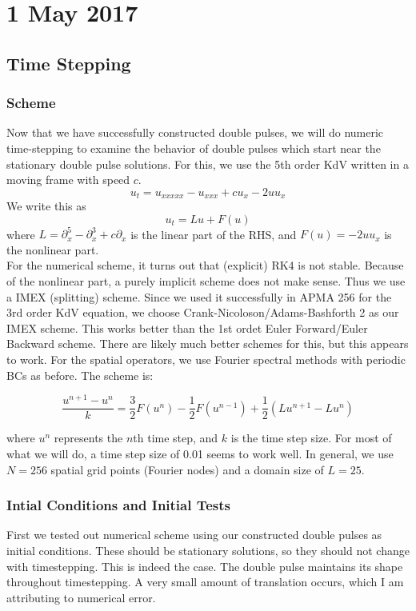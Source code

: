 \documentclass[12pt]{article}
\begin{document}
\section*{1 May 2017}

\subsection*{Time Stepping}

\subsubsection*{Scheme}
Now that we have successfully constructed double pulses, we will do numeric time-stepping to examine the behavior of double pulses which start near the stationary double pulse solutions. For this, we use the 5th order KdV written in a moving frame with speed $c$.
\[
u_t = u_{xxxxx} - u_{xxx} + c u_x - 2 u u_x
\]
We write this as
\[
u_t = Lu + F(u)
\]
where $L = \partial_x^5 - \partial_x^3 + c \partial_x$ is the linear part of the RHS, and $F(u) = -2 u u_x$ is the nonlinear part.\\

For the numerical scheme, it turns out that (explicit) RK4 is not stable. Because of the nonlinear part, a purely implicit scheme does not make sense. Thus we use a IMEX (splitting) scheme. Since we used it successfully in APMA 256 for the 3rd order KdV equation, we choose Crank-Nicoloson/Adams-Bashforth 2 as our IMEX scheme. This works better than the 1st ordet Euler Forward/Euler Backward scheme. There are likely much better schemes for this, but this appears to work. For the spatial operators, we use Fourier spectral methods with periodic BCs as before. The scheme is:

\[
\frac{u^{n+1} - u^n}{k} = \frac{3}{2}F(u^n) - \frac{1}{2}F(u^{n-1}) + \frac{1}{2}\left(Lu^{n+1} - Lu^n \right) 
\]

where $u^n$ represents the $n$th time step, and $k$ is the time step size. For most of what we will do, a time step size of 0.01 seems to work well. In general, we use $N = 256$ spatial grid points (Fourier nodes) and a domain size of $L = 25$.

\subsubsection*{Intial Conditions and Initial Tests}
First we tested out numerical scheme using our constructed double pulses as initial conditions. These should be stationary solutions, so they should not change with timestepping. This is indeed the case. The double pulse maintains its shape throughout timestepping. A very small amount of translation occurs, which I am attributing to numerical error.\\
\end{document}
